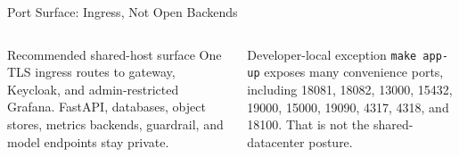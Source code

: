 \documentclass[aspectratio=169,10pt]{beamer}
\newcommand{\source}[1]{%
}
\begin{document}
\begin{frame}{Port Surface: Ingress, Not Open Backends}

  \vspace{0.18cm}
  \begin{columns}[T,totalwidth=\textwidth]
    \begin{exampleblock}{Recommended shared-host surface}
      One TLS ingress routes to gateway, Keycloak, and admin-restricted Grafana. FastAPI, databases, object stores, metrics backends, guardrail, and model endpoints stay private.
    \end{exampleblock}
    \begin{alertblock}{Developer-local exception}
      \texttt{make app-up} exposes many convenience ports, including 18081, 18082, 13000, 15432, 19000, 15000, 19090, 4317, 4318, and 18100. That is not the shared-datacenter posture.
    \end{alertblock}
  \end{columns}
  \source{\texttt{PORT.md}, ``Shared Datacenter Port Policy'' and ``Port Relationship Chart''.}
\end{frame}
\end{document}
